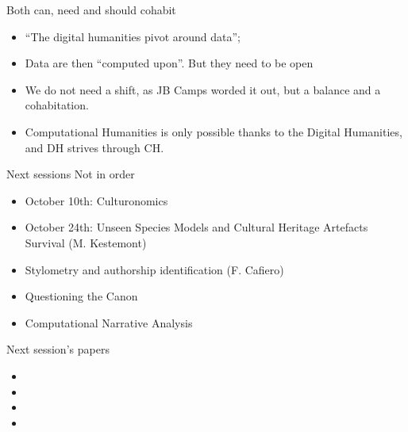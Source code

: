 \documentclass[aspectratio=169]{beamer}
\begin{document}
\begin{frame}{Both can, need and should cohabit}
    \begin{itemize}
        \item ``The digital humanities pivot around data'';
        \item Data are then ``computed upon''. But they need to be open
        \item We do not need a shift, as JB Camps worded it out, but a balance and a cohabitation.
        \item Computational Humanities is only possible thanks to the Digital Humanities, and DH strives through CH.
    \end{itemize}
\end{frame}

\begin{frame}{Next sessions}
    Not in order
    \begin{itemize}
        \item October 10th: Culturonomics 
        \item October 24th: Unseen Species Models and Cultural Heritage Artefacts Survival (M. Kestemont)
        \item Stylometry and authorship identification (F. Cafiero)
        \item Questioning the Canon
        \item Computational Narrative Analysis
    \end{itemize}
\end{frame}

\begin{frame}{Next session's papers}
    \begin{itemize}
        \item {}
        \item {}
        \item {}
        \item {}
    \end{itemize}
\end{frame}
\end{document}
